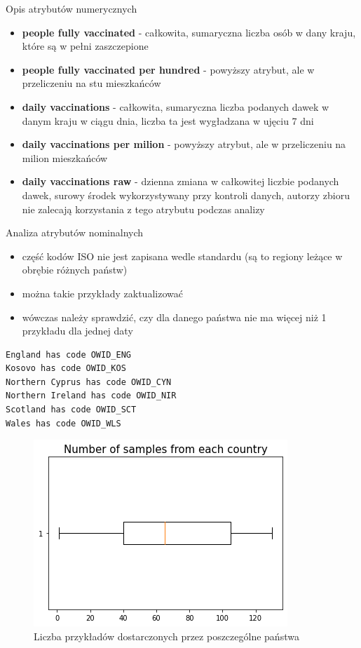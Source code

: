 \documentclass[11pt]{beamer}
\begin{document}
\begin{frame}{Opis atrybutów numerycznych}
\begin{itemize}
	\item \textbf{people fully vaccinated} - całkowita, sumaryczna liczba osób w dany kraju, które są w pełni zaszczepione
	\item \textbf{people fully vaccinated per hundred} - powyższy atrybut, ale w przeliczeniu na stu mieszkańców
	\item \textbf{daily vaccinations} - całkowita, sumaryczna liczba podanych dawek w danym kraju w ciągu dnia, liczba ta jest wygładzana w ujęciu 7 dni
	\item \textbf{daily vaccinations per milion} - powyższy atrybut, ale w przeliczeniu na milion mieszkańców
	\item \textbf{daily vaccinations raw} - dzienna zmiana w całkowitej liczbie podanych dawek, surowy środek wykorzystywany przy kontroli danych, autorzy zbioru nie zalecają korzystania z tego atrybutu podczas analizy
\end{itemize}
\end{frame}

\begin{frame}[fragile]{Analiza atrybutów nominalnych} 
\begin{itemize}
\item część kodów ISO nie jest zapisana wedle standardu (są to regiony leżące w obrębie różnych państw)
\item można takie przykłady zaktualizować
\item wówczas należy sprawdzić, czy dla danego państwa nie ma więcej niż 1 przykładu dla jednej daty
\end{itemize}
\begin{lstlisting}
England has code OWID_ENG
Kosovo has code OWID_KOS
Northern Cyprus has code OWID_CYN
Northern Ireland has code OWID_NIR
Scotland has code OWID_SCT
Wales has code OWID_WLS
\end{lstlisting}
\end{frame}



\begin{frame}
\begin{figure}[h]
\centering
\includegraphics[scale=0.5]{../img/boxplot_of_samples.png} 
\caption{Liczba przykładów dostarczonych przez poszczególne państwa}
\label{Rys:boxplotSamples}
\end{figure}
\end{frame}
\end{document}
